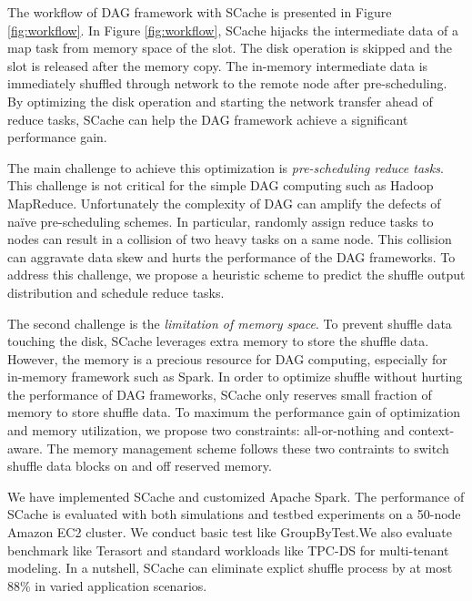 The workflow of DAG framework with SCache is presented in Figure \ref{fig:workflow}. In Figure \ref{fig:workflow}, SCache hijacks the intermediate data of a map task from memory space of the slot. The disk operation is skipped and the slot is released after the memory copy. The in-memory intermediate data is immediately shuffled through network to the remote node after pre-scheduling. By optimizing the disk operation and starting the network transfer ahead of reduce tasks, SCache can help the DAG framework achieve a significant performance gain.

The main challenge to achieve this optimization is \textit{pre-scheduling reduce tasks}. This challenge is not critical for the simple DAG computing such as Hadoop MapReduce\cite{mapreduce}. Unfortunately the complexity of DAG can amplify the defects of na\"{i}ve pre-scheduling schemes. In particular, randomly assign reduce tasks to nodes can result in a collision of two heavy tasks on a same node. This collision can aggravate data skew and hurts the performance of the DAG frameworks. To address this challenge, we propose a heuristic scheme to predict the shuffle output distribution and schedule reduce tasks.

The second challenge is the \textit{limitation of memory space}. To prevent shuffle data touching the disk, SCache leverages extra memory to store the shuffle data. However, the memory is a precious resource for DAG computing, especially for in-memory framework such as Spark\cite{spark}. In order to optimize shuffle without hurting the performance of DAG frameworks, SCache only reserves small fraction of memory to store shuffle data. To maximum the performance gain of optimization and memory utilization, we propose two constraints: all-or-nothing and context-aware. The memory management scheme follows these two contraints to switch shuffle data blocks on and off reserved memory.

We have implemented SCache and customized Apache Spark\cite{apachespark}. The performance of SCache is evaluated with both simulations and testbed experiments on a 50-node Amazon EC2 cluster. We conduct basic test like GroupByTest.We also evaluate benchmark like Terasort\cite{spark-tera} and standard workloads like TPC-DS\cite{tpcds} for multi-tenant modeling. In a nutshell, SCache can eliminate explict shuffle process by at most 88\% in varied application scenarios.




